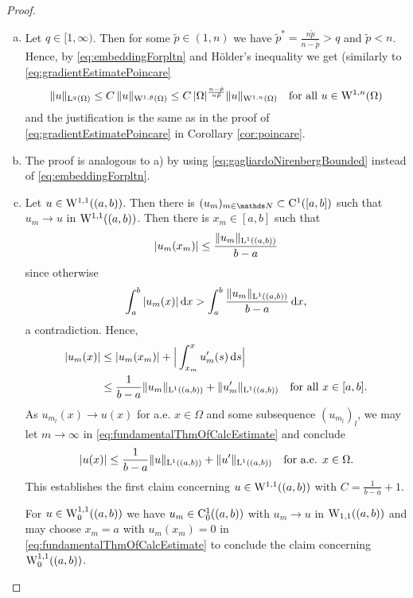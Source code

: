 \begin{proof}
  \begin{enumerate}[a)]
    \item Let $q \in [1,\infty)$.
      Then for some $\tilde p \in (1,n)$ we have $\tilde p^* = \frac{n \tilde p}{n - \tilde p} > q$ and $\tilde p < n$.
      Hence, by \eqref{eq:embeddingForpltn} and Hölder's inequality we get (similarly to \eqref{eq:gradientEstimatePoincare}
      $$
      \|u\|_{\mathrm{L}^q(\Omega)} 
      \leq C\, \|u\|_{\mathrm{W}^{1,\tilde p}(\Omega)} 
      \leq C\, |\Omega|^{\frac{n - \tilde p}{n \tilde p}} \|u\|_{\mathrm{W}^{1,n}(\Omega)} \quad\text{for all } u \in \mathrm{W}^{1,n}(\Omega)
      $$
      and the justification is the same as in the proof of \eqref{eq:gradientEstimatePoincare} in Corollary \ref{cor:poincare}.

    \item The proof is analogous to a) by using \eqref{eq:gagliardoNirenbergBounded} instead of \eqref{eq:embeddingForpltn}.

    \item Let $u \in \mathrm{W}^{1,1}((a,b))$.
      Then there is $(u_m)_{m \in \N} \subset \CC^1([a,b])$ such that $u_m \to u$ in $\mathrm{W}^{1,1}((a,b))$.
      Then there is $x_m \in [a,b]$ such that
      $$
      |u_m(x_m)| \leq \frac{\|u_m\|_{\mathrm{L}^1((a,b))}}{b - a}
      $$
      since otherwise 
      $$\int_a^b|u_m(x)| \, {\operatorname{d}\!{x}} > \int_a^b \frac{\|u_m\|_{\mathrm{L}^1((a,b))}}{b - a} \, {\operatorname{d}\!{x}},$$
      a contradiction. 
      Hence,
      \begin{equation}
        \label{eq:fundamentalThmOfCalcEstimate}
        \begin{split}
        |u_m(x)| 
          &\leq |u_m(x_m)| + \Big| \int_{x_m}^x u_m'(s) \, {\operatorname{d}\!{s}} \Big| \\
          & \leq \frac{1}{b - a} \| u_m\|_{\mathrm{L}^1((a,b))} + \|u_m'\|_{\mathrm{L}^1((a,b))} \quad\text{for all } x \in [a,b].
        \end{split}
      \end{equation}
      As $u_{m_l}(x) \to u(x)$ for a.e. $x \in \Omega$ and some subsequence $(u_{m_l})_l$, we may let $m \to \infty$ in \eqref{eq:fundamentalThmOfCalcEstimate} and conclude
      $$
      |u(x)| \leq \frac{1}{b - a} \|u\|_{\mathrm{L}^1((a,b))} + \|u'\|_{\mathrm{L}^1((a,b))} \quad\text{for a.e. } x \in \Omega.
      $$
      This establishes the first claim concerning $u \in \mathrm{W}^{1,1}((a,b))$ with $C = \frac{1}{b - a} + 1$.

      For $u \in \mathrm{W}_0^{1,1}((a,b))$ we have $u_m \in \mathrm{C}_0^1((a,b))$ with $u_m \to u$ in $\mathrm{W}_{1,1}((a,b))$ and may choose $x_m = a$ with $u_m(x_m) = 0$ in \eqref{eq:fundamentalThmOfCalcEstimate} to conclude the claim concerning $\mathrm{W}_0^{1,1}((a,b))$. \qedhere
  \end{enumerate}
\end{proof}

